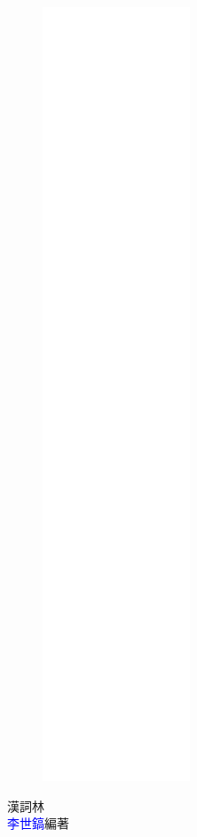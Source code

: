\documentclass[a5paper,12pt]{book}
\begin{document}
\frontmatter
\linespread{1.25}
\begin{figure}
\includegraphics[height=230mm]{cover.png}
\end{figure}
\hfill
\vfill
{\Huge\textcolor{deepblue}{漢詞林}}\\
{\textcolor{blue}{李世鎬}\hspace{14pt}編著}
\vspace{64pt}
\newpage
\addtolength{\topmargin}{20mm}
\mainmatter
\linespread{1.25}


\newpage
\begin{multicols}{3}

\end{multicols}

\appendix
\printbibliography{}
\end{document}
